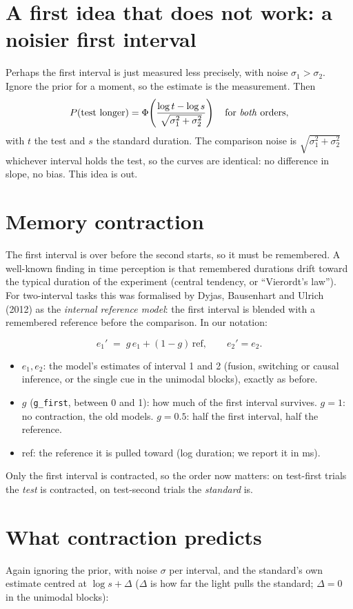 \documentclass[11pt,a4paper]{article}
\newenvironment{keybox}[1][]%
  {\def\kbtitle{#1}\setlength{\fboxsep}{7pt}\begin{lrbox}{\keyboxbin}%
   \begin{minipage}{\dimexpr\linewidth-2\fboxsep-2\fboxrule\relax}%
   \ifx\kbtitle\empty\else{\bfseries\kbtitle}\par\fi}%
  {\end{minipage}\end{lrbox}\par\medskip\noindent
   \fcolorbox{blue!40!black}{blue!3}{\usebox{\keyboxbin}}\par\medskip}
\newcommand{\step}[1]{\section{#1}}
\begin{document}
\step{A first idea that does not work: a noisier first interval}

Perhaps the first interval is just measured less precisely, with noise $\sigma_1 > \sigma_2$. Ignore
the prior for a moment, so the estimate is the measurement. Then
\[
  P(\text{test longer}) =
  \Phi\!\left(\frac{\log t - \log s}{\sqrt{\sigma_1^2 + \sigma_2^2}}\right)
  \quad\text{for \emph{both} orders,}
\]
with $t$ the test and $s$ the standard duration. The comparison noise is
$\sqrt{\sigma_1^2+\sigma_2^2}$ whichever interval holds the test, so the curves are identical: no
difference in slope, no bias. This idea is out.

\step{Memory contraction}

The first interval is over before the second starts, so it must be remembered. A well-known finding in
time perception is that remembered durations drift toward the typical duration of the experiment
(central tendency, or ``Vierordt's law''). For two-interval tasks this was formalised by Dyjas,
Bausenhart and Ulrich (2012) as the \emph{internal reference model}: the first interval is blended with a
remembered reference before the comparison. In our notation:
\begin{keybox}
\[
  e_1' \;=\; g\, e_1 + (1-g)\,\text{ref}, \qquad e_2' = e_2 .
\]
\begin{itemize}
  \item $e_1, e_2$: the model's estimates of interval 1 and 2 (fusion, switching or causal inference, or
        the single cue in the unimodal blocks), exactly as before.
  \item $g$ (\texttt{g\_first}, between 0 and 1): how much of the first interval survives.
        $g = 1$: no contraction, the old models. $g = 0.5$: half the first interval, half the reference.
  \item ref: the reference it is pulled toward (log duration; we report it in ms).
\end{itemize}
\end{keybox}
Only the first interval is contracted, so the order now matters: on test-first trials the
\emph{test} is contracted, on test-second trials the \emph{standard} is.

\step{What contraction predicts}

Again ignoring the prior, with noise $\sigma$ per interval, and the standard's own estimate centred at
$\log s + \Delta$ ($\Delta$ is how far the light pulls the standard; $\Delta = 0$ in the unimodal blocks):
\end{document}
